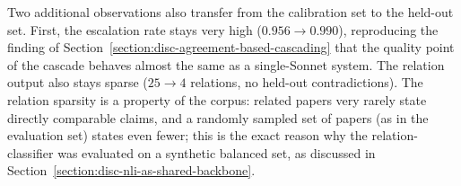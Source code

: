 \begin{itemize}[label={},leftmargin=1.5em]
    Two additional observations also transfer from the calibration set to the held-out set. First, the escalation rate stays very high ($0.956 \rightarrow 0.990$), reproducing the finding of Section~\ref{section:disc-agreement-based-cascading} that the quality point of the cascade behaves almost the same as a single-Sonnet system. The relation output also stays sparse ($25 \rightarrow 4$ relations, no held-out contradictions). The relation sparsity is a property of the corpus: related papers very rarely state directly comparable claims, and a randomly sampled set of papers (as in the evaluation set) states even fewer; this is the exact reason why the relation-classifier was evaluated on a synthetic balanced set, as discussed in Section~\ref{section:disc-nli-as-shared-backbone}.

\end{itemize}